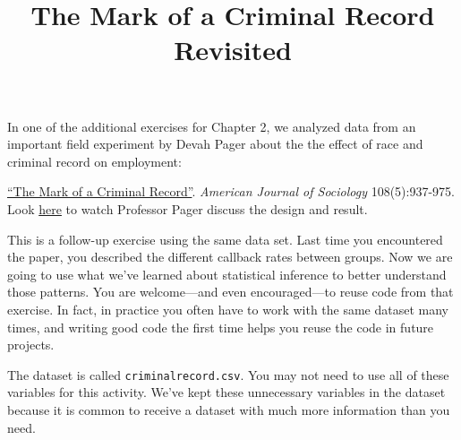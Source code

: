 \documentclass[]{article}
\title{The Mark of a Criminal Record Revisited}
\author{}
\date{}
\begin{document}
\maketitle


In one of the additional exercises for Chapter 2, we analyzed data from
an important field experiment by Devah Pager about the the effect of
race and criminal record on employment:

\href{https://dx.doi.org/10.1086/374403}{``The Mark of a Criminal
Record''}. \emph{American Journal of Sociology} 108(5):937-975. Look
\href{https://youtu.be/nUZqvsF_Wt0}{here} to watch Professor Pager
discuss the design and result.

This is a follow-up exercise using the same data set. Last time you
encountered the paper, you described the different callback rates
between groups. Now we are going to use what we've learned about
statistical inference to better understand those patterns. You are
welcome---and even encouraged---to reuse code from that exercise. In
fact, in practice you often have to work with the same dataset many
times, and writing good code the first time helps you reuse the code in
future projects.

The dataset is called \texttt{criminalrecord.csv}. You may not need to
use all of these variables for this activity. We've kept these
unnecessary variables in the dataset because it is common to receive a
dataset with much more information than you need.
\end{document}
